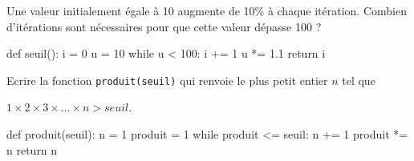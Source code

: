 \documentclass[11pt, a4paper]{report}
\begin{document}
    \begin{minipage}{0.48\linewidth}
        \begin{exercice_cours}

Une valeur initialement égale à 10 augmente de 10\% à chaque itération. Combien d'itérations sont nécessaires pour que cette valeur dépasse 100 ?
    \end{exercice_cours}

    \end{minipage}\hfill
    \begin{minipage}{0.48\linewidth}
\begin{blocvisible}[height=4.5]
    \begin{CodePythontexAlt}[TaillePolice=\large, Largeur=1\linewidth,Centre,Lignes=true,PremLigne=1]{}
def seuil():
    i = 0
    u = 10
    while u < 100:
        i += 1
        u *= 1.1
    return i
    \end{CodePythontexAlt}
\end{blocvisible}
    \end{minipage}
    
    
    \begin{minipage}{0.48\linewidth}
        \begin{exercice_cours}

Ecrire la fonction \verb|produit(seuil)| qui renvoie le plus petit entier $n$ tel que 

$1 \times 2 \times 3 \times \ldots \times n > seuil$.
    \end{exercice_cours}

    \end{minipage}\hfill
    \begin{minipage}{0.48\linewidth}
\begin{blocvisible}[height=4.5]
    \begin{CodePythontexAlt}[TaillePolice=\large, Largeur=1\linewidth,Centre,Lignes=true,PremLigne=1]{}
def produit(seuil):
    n = 1
    produit = 1
    while produit <= seuil:
        n += 1
        produit *= n
    return n
    \end{CodePythontexAlt}
\end{blocvisible}


    \end{minipage}
\end{document}
